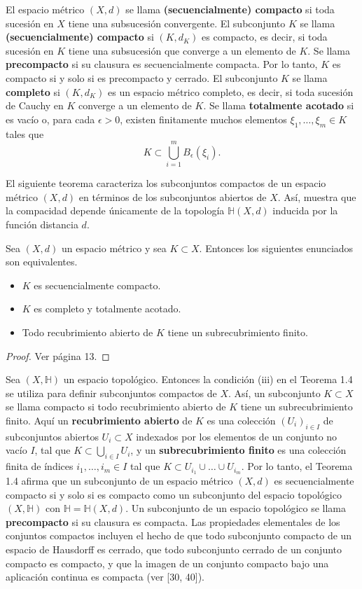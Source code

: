 El espacio métrico $(X, d)$ se llama \textbf{(secuencialmente) compacto} si toda sucesión en $X$ tiene una subsucesión convergente. El subconjunto $K$ se llama \textbf{(secuencialmente) compacto} si $(K,d_{K})$ es compacto, es decir, si toda sucesión en $K$ tiene una subsucesión que converge a un elemento de $K$. Se llama \textbf{precompacto} si su clausura es secuencialmente compacta. Por lo tanto, $K$ es compacto si y solo si es precompacto y cerrado. El subconjunto $K$ se llama \textbf{completo} si $(K,d_{K})$ es un espacio métrico completo, es decir, si toda sucesión de Cauchy en $K$ converge a un elemento de $K$. Se llama \textbf{totalmente acotado} si es vacío o, para cada $\epsilon>0$, existen finitamente muchos elementos $\xi_{1},\dots,\xi_{m}\in K$ tales que
\[ K\subset\bigcup_{i=1}^{m}B_{\epsilon}(\xi_{i}). \]

El siguiente teorema caracteriza los subconjuntos compactos de un espacio métrico $(X, d)$ en términos de los subconjuntos abiertos de $X$. Así, muestra que la compacidad depende únicamente de la topología $\mathbb{H}(X,d)$ inducida por la función distancia $d$.

\begin{theorem} \label{thm:1.4}
Sea $(X,d)$ un espacio métrico y sea $K\subset X$. Entonces los siguientes enunciados son equivalentes.
\begin{itemize}
    \item[(i)] $K$ es secuencialmente compacto.
    \item[(ii)] $K$ es completo y totalmente acotado.
    \item[(iii)] Todo recubrimiento abierto de $K$ tiene un subrecubrimiento finito.
\end{itemize}
\end{theorem}
\begin{proof}
Ver página 13.
\end{proof}

Sea $(X, \mathbb{H})$ un espacio topológico. Entonces la condición (iii) en el Teorema 1.4 se utiliza para definir subconjuntos compactos de $X$. Así, un subconjunto $K\subset X$ se llama compacto si todo recubrimiento abierto de $K$ tiene un subrecubrimiento finito. Aquí un \textbf{recubrimiento abierto} de $K$ es una colección $(U_{i})_{i\in I}$ de subconjuntos abiertos $U_{i}\subset X$ indexados por los elementos de un conjunto no vacío $I$, tal que $K\subset\bigcup_{i\in I}U_{i}$, y un \textbf{subrecubrimiento finito} es una colección finita de índices $i_{1},\dots,i_{m}\in I$ tal que $K\subset U_{i_{1}}\cup\dots\cup U_{i_{m}}$. Por lo tanto, el Teorema 1.4 afirma que un subconjunto de un espacio métrico $(X, d)$ es secuencialmente compacto si y solo si es compacto como un subconjunto del espacio topológico $(X, \mathbb{H})$ con $\mathbb{H}=\mathbb{H}(X,d)$. Un subconjunto de un espacio topológico se llama \textbf{precompacto} si su clausura es compacta. Las propiedades elementales de los conjuntos compactos incluyen el hecho de que todo subconjunto compacto de un espacio de Hausdorff es cerrado, que todo subconjunto cerrado de un conjunto compacto es compacto, y que la imagen de un conjunto compacto bajo una aplicación continua es compacta (ver [30, 40]).

